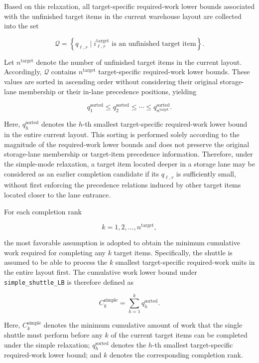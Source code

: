 Based on this relaxation, all target-specific required-work lower bounds
associated with the unfinished target items in the current warehouse layout
are collected into the set

\[
\mathcal{Q}
=
\left\{
q_{\ell,r}
\mid
i^{\mathrm{target}}_{\ell,r}
\text{ is an unfinished target item}
\right\}.
\]

Let \(n^{\mathrm{target}}\) denote the number of unfinished target items in the
current layout. Accordingly, \(\mathcal{Q}\) contains
\(n^{\mathrm{target}}\) target-specific required-work lower bounds. These
values are sorted in ascending order without considering their original
storage-lane membership or their in-lane precedence positions, yielding

\[
q^{\mathrm{sorted}}_{1}
\leq
q^{\mathrm{sorted}}_{2}
\leq
\cdots
\leq
q^{\mathrm{sorted}}_{n^{\mathrm{target}}}.
\]

Here, \(q^{\mathrm{sorted}}_{h}\) denotes the \(h\)-th smallest
target-specific required-work lower bound in the entire current layout. This
sorting is performed solely according to the magnitude of the required-work
lower bounds and does not preserve the original storage-lane membership or
target-item precedence information. Therefore, under the simple-mode
relaxation, a target item located deeper in a storage lane may be considered as
an earlier completion candidate if its \(q_{\ell,r}\) is sufficiently small,
without first enforcing the precedence relations induced by other target items
located closer to the lane entrance.

For each completion rank

\[
k
=
1,2,\ldots,n^{\mathrm{target}},
\]

the most favorable assumption is adopted to obtain the minimum cumulative work
required for completing any \(k\) target items. Specifically, the shuttle is
assumed to be able to process the \(k\) smallest target-specific required-work
units in the entire layout first. The cumulative work lower bound under
\texttt{simple\_shuttle\_LB} is therefore defined as

\begin{equation}
C_k^{\mathrm{simple}}
=
\sum_{h=1}^{k}
q^{\mathrm{sorted}}_{h}.   
\end{equation}

Here, \(C_k^{\mathrm{simple}}\) denotes the minimum cumulative amount of work
that the single shuttle must perform before any \(k\) of the current target
items can be completed under the simple relaxation;
\(q^{\mathrm{sorted}}_{h}\) denotes the \(h\)-th smallest target-specific
required-work lower bound; and \(k\) denotes the corresponding completion
rank.

